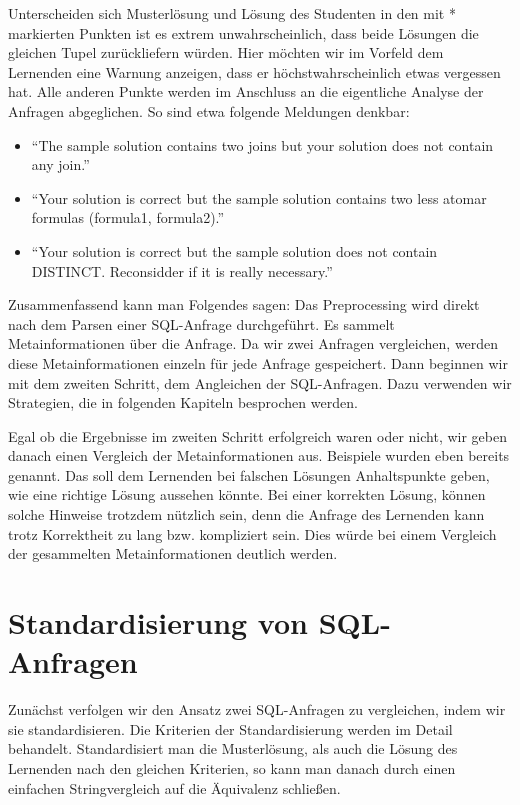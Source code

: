 Unterscheiden sich Musterlösung und Lösung des Studenten in den mit * markierten Punkten ist es extrem unwahrscheinlich, dass beide Lösungen die gleichen Tupel zurückliefern würden. Hier möchten wir im Vorfeld dem Lernenden eine Warnung anzeigen, dass er höchstwahrscheinlich etwas vergessen hat. Alle anderen Punkte werden im Anschluss an die eigentliche Analyse der Anfragen abgeglichen. So sind etwa folgende Meldungen denkbar:

\begin{itemize}
\item ``The sample solution contains two joins but your solution does not contain any join.''
\item ``Your solution is correct but the sample solution contains two less atomar formulas (formula1, formula2).''
\item ``Your solution is correct but the sample solution does not contain DISTINCT. Reconsidder if it is really necessary.''
\end{itemize}

Zusammenfassend kann man Folgendes sagen: Das Preprocessing wird direkt nach dem Parsen einer SQL-Anfrage durchgeführt. Es sammelt Metainformationen über die Anfrage. Da wir zwei Anfragen vergleichen, werden diese Metainformationen einzeln für jede Anfrage gespeichert. Dann beginnen wir mit dem zweiten Schritt, dem Angleichen der SQL-Anfragen. Dazu verwenden wir Strategien, die in folgenden Kapiteln besprochen werden.

Egal ob die Ergebnisse im zweiten Schritt erfolgreich waren oder nicht, wir geben danach einen Vergleich der Metainformationen aus. Beispiele wurden eben bereits genannt. Das soll dem Lernenden bei falschen Lösungen Anhaltspunkte geben, wie eine richtige Lösung aussehen könnte. Bei einer korrekten Lösung, können solche Hinweise trotzdem nützlich sein, denn die Anfrage des Lernenden kann trotz Korrektheit zu lang bzw. kompliziert sein. Dies würde bei einem Vergleich der gesammelten Metainformationen deutlich werden.

\section{Standardisierung von SQL-Anfragen}

Zunächst verfolgen wir den Ansatz zwei SQL-Anfragen zu vergleichen, indem wir sie standardisieren. Die Kriterien der Standardisierung werden im Detail behandelt. Standardisiert man die Musterlösung, als auch die Lösung des Lernenden nach den gleichen Kriterien, so kann man danach durch einen einfachen Stringvergleich auf die Äquivalenz schließen. 

